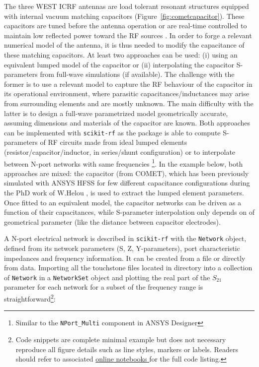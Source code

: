{The three WEST ICRF antennas are load tolerant resonant structures equipped with internal vacuum matching capacitors (Figure~\ref{fig:cometcapacitor}). These capacitors are tuned before the antenna operation or are real-time controlled to maintain low reflected power toward the RF sources . In order to forge a relevant numerical model of the antenna, it is thus needed to modify the capacitance of these matching capacitors. At least two approaches can be used: (i) using an equivalent lumped model of the capacitor or (ii) interpolating the capacitor S-parameters from full-wave simulations (if available). The challenge with the former is to use a relevant model to capture the RF behaviour of the capacitor in its operational environment, where parasitic capacitances/inductances may arise from surrounding elements and are mostly unknown. The main difficulty with the latter is to design a full-wave parametrized model geometrically accurate, assuming dimensions and materials of the capacitor are known. Both approaches can be implemented with \texttt{scikit-rf} as the package is able to compute S-parameters of RF circuits made from ideal lumped elements (resistor/capacitor/inductor, in series/shunt configuration)  or to interpolate between N-port networks with same frequencies \footnote{Similar to the \texttt{NPort\_Multi} component in ANSYS Designer}. In the example below, both approaches are mixed: the capacitor (from COMET), which has been previously simulated with ANSYS HFSS for few different capacitance configurations during the PhD work of W.Helou , is used to extract the lumped element parameters. Once fitted to an equivalent model, the capacitor networks can be driven as a function of their capacitances, while S-parameter interpolation only depends on of geometrical parameter (like the distance between capacitor electrodes).

A N-port electrical network is described in \texttt{scikit-rf} with the \texttt{Network} object, defined from its network parameters (S, Z, Y-parameters), port characteristic impedances and frequency information. It can be created from a file or directly from data. Importing all the touchstone files located in directory into a collection of \texttt{Network} in a \texttt{NetworkSet} object and plotting the real part of the $S_{21}$ parameter for each network for a subset of the frequency range is straightforward\footnote{Code snippets are complete minimal example but does not necessary reproduce all figure details such as line styles, markers or labels. Readers should refer to associated \href{https://doi.org/10.5281/zenodo.2668370}{online notebooks }for the full code listing.}:

}
